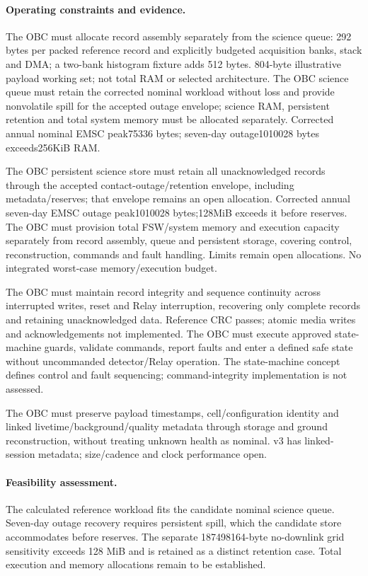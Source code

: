 \paragraph{Operating constraints and evidence.} 
The OBC must allocate record assembly separately from the science queue: 292 bytes per packed reference record and explicitly budgeted acquisition banks, stack and DMA; a two-bank histogram fixture adds 512 bytes. 804-byte illustrative payload working set; not total RAM or selected architecture.
The OBC science queue must retain the corrected nominal workload without loss and provide nonvolatile spill for the accepted outage envelope; science RAM, persistent retention and total system memory must be allocated separately. Corrected annual nominal EMSC peak75336 bytes; seven-day outage1010028 bytes exceeds256KiB RAM.

The OBC persistent science store must retain all unacknowledged records through the accepted contact-outage/retention envelope, including metadata/reserves; that envelope remains an open allocation. Corrected annual seven-day EMSC outage peak1010028 bytes;128MiB exceeds it before reserves.
The OBC must provision total FSW/system memory and execution capacity separately from record assembly, queue and persistent storage, covering control, reconstruction, commands and fault handling. Limits remain open allocations. No integrated worst-case memory/execution budget.

The OBC must maintain record integrity and sequence continuity across interrupted writes, reset and Relay interruption, recovering only complete records and retaining unacknowledged data. Reference CRC passes; atomic media writes and acknowledgements not implemented.
The OBC must execute approved state-machine guards, validate commands, report faults and enter a defined safe state without uncommanded detector/Relay operation. The state-machine concept defines control and fault sequencing; command-integrity implementation is not assessed.

The OBC must preserve payload timestamps, cell/configuration identity and linked livetime/background/quality metadata through storage and ground reconstruction, without treating unknown health as nominal. v3 has linked-session metadata; size/cadence and clock performance open.

\paragraph{Feasibility assessment.} The calculated reference workload fits the candidate nominal science queue. Seven-day outage recovery requires persistent spill, which the candidate store accommodates before reserves. The separate 187498164-byte no-downlink grid sensitivity exceeds 128 MiB and is retained as a distinct retention case. Total execution and memory allocations remain to be established.
